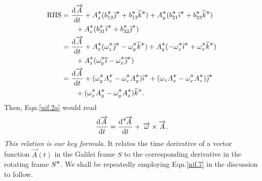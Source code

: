 \begin{align*}
\text{RHS}&=\dv{\vec{A}}{t}+
A^{\bst}_x (b^{\bst}_{12}\jay^{\bst}
+b^{\bst}_{13}\kay^{\bst}) +
 A^{\bst}_y (b^{\bst}_{21}\eye^{\bst}
+b^{\bst}_{23}\kay^{\bst}) \notag\\
&\qquad +A^{\bst}_z (b^{\bst}_{31}\eye^{\bst}
+b^{\bst}_{32}\jay^{\bst })\\&
=\dv{\vec{A}}{t} +
A^{\bst}_x(\gkw^{\bst}_z\jay^{\bst} -
\gkw^{\bst}_y\kay^{\bst})
+A^{\bst}_y(-\gkw^{\bst}_z\eye^{\bst} +
\gkw^{\bst}_x\kay^{\bst})\notag\\&
\qquad + A^{\bst}_z (\gkw^{\bst}_y\eye
-\gkw^{\bst}_x\jay^{\bst})\\
&=\dv{\vec{A}}{t}+ (\gkw^{\bst}_y
A^{\bst}_z-\gkw^{\bst}_z A^{\bst}_y)\eye^{\bst}
+ (\gkw_z A^{\bst}_x-\gkw^{\bst}_x
A^{\bst}_z)\jay^{\bst} \notag\\&
\qquad + (\gkw^{\bst}_x
A^{\bst}_y-\gkw^{\bst}_y
A^{\bst}_x)\kay^{\bst}.
\end{align*}
Then, Eqn.\eqref{nif.2a} would read
\begin{align}\label{nif.7}
\dv{\vec{A}}{t}=\ldv{\bst}{\vec{A}}{t} +
\,\vec{\gkw}\times \vec{A}.
\end{align}
\textsl{This relation is our key formula}. It relates the 
time derivative of a vector function $\vec{A}(t)$ in 
the Galilei frame $S$ to the corresponding derivative in 
the rotating frame $S^\bst$. We shall be repeatedly 
employing Eqn.\eqref{nif.7} in the discussion to follow.



\begin{figure}[H]
\centering
{}
 \caption{}\label{fig2.2}
\end{figure}


